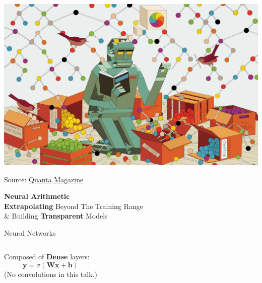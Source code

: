 \documentclass[aspectratio=169,professionalfont,xcolor={dvipsnames},hyperref={colorlinks=true,urlcolor=MidnightBlue}]{beamer}
\begin{document}
{
  {\includegraphics[width = \the\paperwidth, height = \the\paperheight]{robot-math.jpg}}
  \begin{frame}
    \vspace{-0.1cm}
    \begin{center}
    \end{center}
    \vspace{7.5cm}\hspace{-1cm}
    {\tiny Source: \href{
      https://www.quantamagazine.org/symbolic-mathematics-finally-yields-to-neural-networks-20200520/}{\underline{Quanta Magazine}}}
  \end{frame}
}

\begin{frame}
  \centering
  {\huge\bf Neural Arithmetic} \\
  \vspace{.5cm}
  \textbf{Extrapolating} Beyond The Training Range \\
  \& Building \textbf{Transparent} Models
\end{frame}

\begin{frame}{Neural Networks}
  \begin{columns}
    \centering
    

    \centering
    Composed of \textbf{Dense} layers:
    \begin{equation*}
      \bm y = \sigma(\bm W\bm x + \bm b)
    \end{equation*}
    {\tiny (No convolutions in this talk.)}
  \end{columns}
\end{frame}
\end{document}
